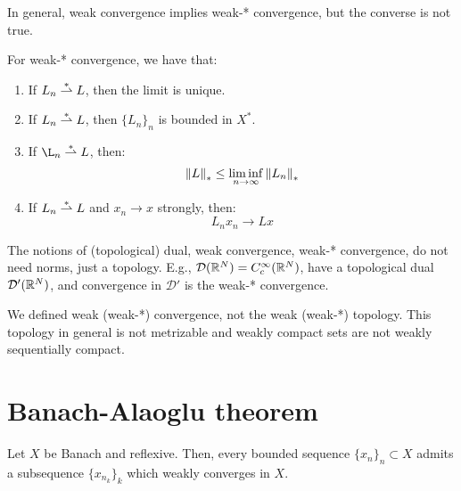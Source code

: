 \begin{fremark}
    In general, weak convergence implies weak-* convergence, but the converse is not true.
\end{fremark}

\vspace{1em}

\begin{fproperties}
    For weak-* convergence, we have that:
    \vspace{1em}
    \begin{enumerate}
        \item If $L_n \overset{*}{\rightharpoonup} L$, then the limit is unique.
        \vspace{1em}
        \item If $L_n \overset{*}{\rightharpoonup} L$, then $\{L_n\}_n$ is bounded in $X^*$.
        \vspace{1em}
        \item If $\L_n \overset{*}{\weakto} L$, then: 
            $$\left\|L\right\|_* \leq \liminf_{n \to \infty} \left\|L_n\right\|_*$$
        \vspace{1em}
        \item If $L_n \overset{*}{\rightharpoonup} L$ and $x_n \to x$ strongly, then:
            $$L_n x_n \to Lx$$
    \end{enumerate}
    
\end{fproperties}

\begin{fremark}
    The notions of (topological) dual, weak convergence, weak-* convergence, do not need
    norms, just a topology. E.g.,  $\mathcal{D}(\mathbb{R}^N) = C_c^{\infty}(\mathbb{R}^N)$,
    have a topological dual $\mathcal{D}'(\mathbb{R}^N)$, and convergence in $\mathcal{D}'$ is the
    weak-* convergence.
\end{fremark}

\begin{fremark}
    We defined weak (weak-*) convergence, not the weak (weak-*) topology. This topology
    in general is not metrizable and weakly compact sets are not weakly sequentially compact.
\end{fremark}

\section{Banach-Alaoglu theorem}

\begin{ftheorem}
    Let $X$ be Banach and reflexive. Then, every bounded sequence $\{x_n\}_n \subset X$
    admits a subsequence $\{x_{n_k}\}_k$ which weakly converges in $X$.
    
\end{ftheorem}

